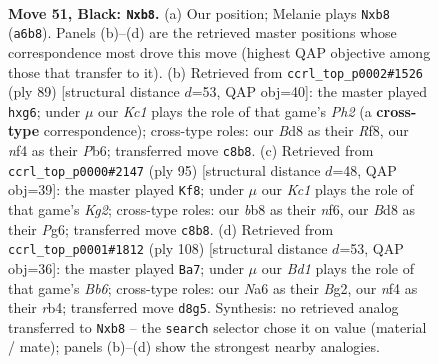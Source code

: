 \documentclass[11pt]{article}
\begin{document}
\clearpage

\begin{figure}[p]\centering
\begin{subfigure}{0.46\textwidth}\centering
\resizebox{\linewidth}{!}{%
\newchessgame
\chessboard[
  setfen={1Bkb4/1p5p/n5pP/p4p2/r4N2/3R2P1/7K/6R1 b - - 0 51},
  showmover=false,
  pgfstyle=straightmove, color=movearrow, markmove={a6-b8}
]}
\caption{}
\end{subfigure}\hfill
\begin{subfigure}{0.46\textwidth}\centering
\resizebox{\linewidth}{!}{%
\newchessgame
\chessboard[
  setfen={5r2/p5kp/1p1n1pN1/1P6/3P2P1/3B1K2/7b/1R2B3 b - - 0 45},
  showmover=false,
  pgfstyle=straightmove, color=movearrow, markmove={h7-g6}
]}
\caption{}
\end{subfigure}
\\[4pt]
\begin{subfigure}{0.46\textwidth}\centering
\resizebox{\linewidth}{!}{%
\newchessgame
\chessboard[
  setfen={8/5pk1/5Np1/1p4P1/b1nrB3/P1R2PK1/8/8 b - - 8 48},
  showmover=false,
  pgfstyle=straightmove, color=movearrow, markmove={g7-f8}
]}
\caption{}
\end{subfigure}\hfill
\begin{subfigure}{0.46\textwidth}\centering
\resizebox{\linewidth}{!}{%
\newchessgame
\chessboard[
  setfen={6k1/5pp1/1B1Rb2p/3n4/1r5P/6P1/5PB1/6K1 w - - 2 55},
  showmover=false,
  pgfstyle=straightmove, color=movearrow, markmove={b6-a7}
]}
\caption{}
\end{subfigure}
\caption{\textbf{Move 51, Black: \texttt{Nxb8}.} (a) Our position; Melanie plays \texttt{Nxb8} (\texttt{a6b8}). Panels (b)--(d) are the retrieved master positions whose correspondence most drove this move (highest QAP objective among those that transfer to it). (b) Retrieved from \texttt{ccrl\_top\_p0002\#1526} (ply 89) [structural distance $d$=53, QAP obj=40]: the master played \texttt{hxg6}; under $\mu$ our \emph{Kc1} plays the role of that game's \emph{Ph2} (a \textbf{cross-type} correspondence); cross-type roles: our \emph{B}d8 as their \emph{R}f8, our \emph{n}f4 as their \emph{P}b6; transferred move \texttt{c8b8}. (c) Retrieved from \texttt{ccrl\_top\_p0000\#2147} (ply 95) [structural distance $d$=48, QAP obj=39]: the master played \texttt{Kf8}; under $\mu$ our \emph{Kc1} plays the role of that game's \emph{Kg2}; cross-type roles: our \emph{b}b8 as their \emph{n}f6, our \emph{B}d8 as their \emph{P}g6; transferred move \texttt{c8b8}. (d) Retrieved from \texttt{ccrl\_top\_p0001\#1812} (ply 108) [structural distance $d$=53, QAP obj=36]: the master played \texttt{Ba7}; under $\mu$ our \emph{Bd1} plays the role of that game's \emph{Bb6}; cross-type roles: our \emph{N}a6 as their \emph{B}g2, our \emph{n}f4 as their \emph{r}b4; transferred move \texttt{d8g5}. Synthesis: no retrieved analog transferred to \texttt{Nxb8} -- the \texttt{search} selector chose it on value (material / mate); panels (b)--(d) show the strongest nearby analogies.}
\label{fig:thought-m101}
\end{figure}
\end{document}
